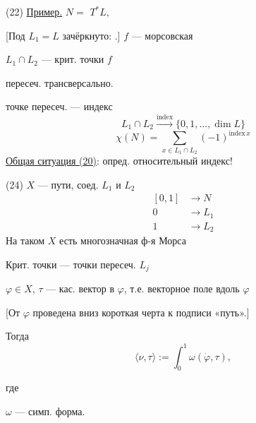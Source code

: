 (22) \underline{Пример.} $N=$
$T^*L$,
\begin{center}
\end{center}
[Под $L_1=L$ зачёркнуто:
.]
$f$ — морсовская

$L_1\cap L_2$ — крит. точки $f$

пересеч. трансверсально.

точке пересеч. — индекс
\begin{equation*}
L_1\cap L_2\overset{\mathrm{index}}{\longrightarrow}
\{0,1,\ldots,\dim L\}
\end{equation*}
\begin{equation*}
\chi(N)=\sum_{x\in L_1\cap L_2}(-1)^{\mathrm{index}\,x}\tag{23}
\end{equation*}
\underline{Общая ситуация (20)}: опред. относительный индекс!

(24) $X$ — пути, соед. $L_1$ и $L_2$
\begin{equation*}
\begin{aligned}
[0,1]&\longrightarrow N\\
0&\longrightarrow L_1\\
1&\longrightarrow L_2
\end{aligned}
\end{equation*}
На таком $X$ есть многозначная ф-я Морса

Крит. точки — точки пересеч. $L_j$

$\varphi\in X$, $\tau$ — кас. вектор в $\varphi$, т.е. векторное поле вдоль $\varphi$

[От $\varphi$ проведена вниз короткая черта к подписи «путь».]



Тогда
\begin{equation*}
\langle \nu,\tau\rangle := \int_0^1 \omega(\dot{\varphi},\tau),
\tag{25}
\end{equation*}

где

$\omega$ — симп. форма.

